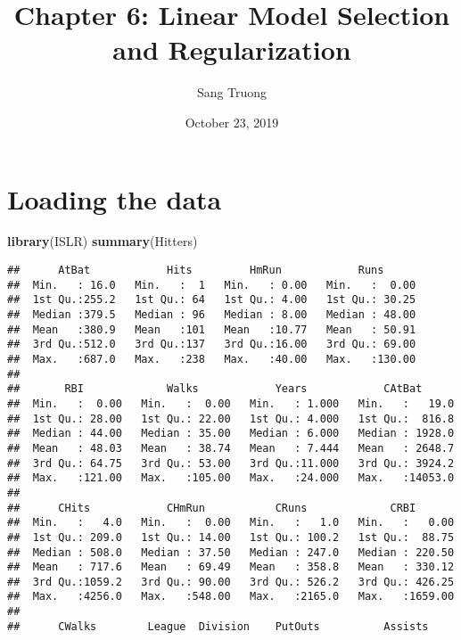 \documentclass[]{article}
\title{Chapter 6: Linear Model Selection and Regularization}
\author{Sang Truong}
\date{October 23, 2019}
\newenvironment{Shaded}{\begin{snugshade}}{\end{snugshade}}
\newcommand{\KeywordTok}[1]{\textcolor[rgb]{0.13,0.29,0.53}{\textbf{#1}}}
\newcommand{\NormalTok}[1]{#1}
\begin{document}
\maketitle

\section{Loading the data}\label{loading-the-data}

\begin{Shaded}
\begin{Highlighting}[]
\KeywordTok{library}\NormalTok{(ISLR)}
\KeywordTok{summary}\NormalTok{(Hitters)}
\end{Highlighting}
\end{Shaded}

\begin{verbatim}
##      AtBat            Hits         HmRun            Runs       
##  Min.   : 16.0   Min.   :  1   Min.   : 0.00   Min.   :  0.00  
##  1st Qu.:255.2   1st Qu.: 64   1st Qu.: 4.00   1st Qu.: 30.25  
##  Median :379.5   Median : 96   Median : 8.00   Median : 48.00  
##  Mean   :380.9   Mean   :101   Mean   :10.77   Mean   : 50.91  
##  3rd Qu.:512.0   3rd Qu.:137   3rd Qu.:16.00   3rd Qu.: 69.00  
##  Max.   :687.0   Max.   :238   Max.   :40.00   Max.   :130.00  
##                                                                
##       RBI             Walks            Years            CAtBat       
##  Min.   :  0.00   Min.   :  0.00   Min.   : 1.000   Min.   :   19.0  
##  1st Qu.: 28.00   1st Qu.: 22.00   1st Qu.: 4.000   1st Qu.:  816.8  
##  Median : 44.00   Median : 35.00   Median : 6.000   Median : 1928.0  
##  Mean   : 48.03   Mean   : 38.74   Mean   : 7.444   Mean   : 2648.7  
##  3rd Qu.: 64.75   3rd Qu.: 53.00   3rd Qu.:11.000   3rd Qu.: 3924.2  
##  Max.   :121.00   Max.   :105.00   Max.   :24.000   Max.   :14053.0  
##                                                                      
##      CHits            CHmRun           CRuns             CRBI        
##  Min.   :   4.0   Min.   :  0.00   Min.   :   1.0   Min.   :   0.00  
##  1st Qu.: 209.0   1st Qu.: 14.00   1st Qu.: 100.2   1st Qu.:  88.75  
##  Median : 508.0   Median : 37.50   Median : 247.0   Median : 220.50  
##  Mean   : 717.6   Mean   : 69.49   Mean   : 358.8   Mean   : 330.12  
##  3rd Qu.:1059.2   3rd Qu.: 90.00   3rd Qu.: 526.2   3rd Qu.: 426.25  
##  Max.   :4256.0   Max.   :548.00   Max.   :2165.0   Max.   :1659.00  
##                                                                      
##      CWalks        League  Division    PutOuts          Assists     

\end{verbatim}
\end{document}
